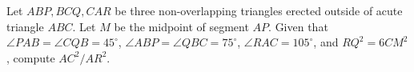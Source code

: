 Let $ ABP, BCQ, CAR$ be three non-overlapping triangles erected outside of acute triangle $ ABC$. Let $ M$ be the midpoint of segment $ AP$. Given that $ \angle PAB = \angle CQB = 45^\circ$, $ \angle ABP = \angle QBC = 75^\circ$, $ \angle RAC = 105^\circ$, and $ RQ^2 = 6CM^2$, compute $ AC^2/AR^2$.